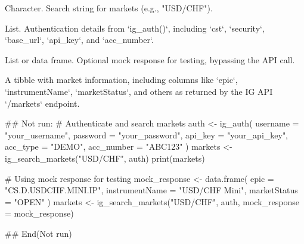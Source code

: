 \documentclass[a4paper]{book}
\begin{document}
%
\begin{Arguments}
\begin{ldescription}
\item[\code{query}] Character. Search string for markets (e.g., "USD/CHF").

\item[\code{auth}] List. Authentication details from `ig\_auth()`, including `cst`, `security`, `base\_url`, `api\_key`, and `acc\_number`.

\item[\code{mock\_response}] List or data frame. Optional mock response for testing, bypassing the API call.
\end{ldescription}
\end{Arguments}
%
\begin{Value}
A tibble with market information, including columns like `epic`, `instrumentName`, `marketStatus`, and others as returned by the IG API `/markets` endpoint.
\end{Value}
%
\begin{Examples}
\begin{ExampleCode}
## Not run: 
# Authenticate and search markets
auth <- ig_auth(
  username = "your_username",
  password = "your_password",
  api_key = "your_api_key",
  acc_type = "DEMO",
  acc_number = "ABC123"
)
markets <- ig_search_markets("USD/CHF", auth)
print(markets)

# Using mock response for testing
mock_response <- data.frame(
  epic = "CS.D.USDCHF.MINI.IP",
  instrumentName = "USD/CHF Mini",
  marketStatus = "OPEN"
)
markets <- ig_search_markets("USD/CHF", auth, mock_response = mock_response)

## End(Not run)

\end{ExampleCode}
\end{Examples}
\printindex{}
\end{document}
